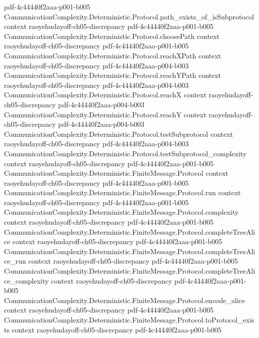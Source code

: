 \begin{lemma}
  {pdf-4c44440f2aaa-p001-b005}
\proofstep
  {CommunicationComplexity.Deterministic.Protocol.path_exists_of_isSubprotocol}
  {context}
  {raoyehudayoff-ch05-discrepancy}
  {pdf-4c44440f2aaa-p001-b005}
\proofstep
  {CommunicationComplexity.Deterministic.Protocol.choosePath}
  {context}
  {raoyehudayoff-ch05-discrepancy}
  {pdf-4c44440f2aaa-p001-b005}
\proofstep
  {CommunicationComplexity.Deterministic.Protocol.reachXPath}
  {context}
  {raoyehudayoff-ch05-discrepancy}
  {pdf-4c44440f2aaa-p004-b003}
\proofstep
  {CommunicationComplexity.Deterministic.Protocol.reachYPath}
  {context}
  {raoyehudayoff-ch05-discrepancy}
  {pdf-4c44440f2aaa-p004-b003}
\proofstep
  {CommunicationComplexity.Deterministic.Protocol.reachX}
  {context}
  {raoyehudayoff-ch05-discrepancy}
  {pdf-4c44440f2aaa-p004-b003}
\proofstep
  {CommunicationComplexity.Deterministic.Protocol.reachY}
  {context}
  {raoyehudayoff-ch05-discrepancy}
  {pdf-4c44440f2aaa-p004-b003}
\proofstep
  {CommunicationComplexity.Deterministic.Protocol.testSubprotocol}
  {context}
  {raoyehudayoff-ch05-discrepancy}
  {pdf-4c44440f2aaa-p004-b003}
\proofstep
  {CommunicationComplexity.Deterministic.Protocol.testSubprotocol_complexity}
  {context}
  {raoyehudayoff-ch05-discrepancy}
  {pdf-4c44440f2aaa-p001-b005}
\proofstep
  {CommunicationComplexity.Deterministic.FiniteMessage.Protocol}
  {context}
  {raoyehudayoff-ch05-discrepancy}
  {pdf-4c44440f2aaa-p001-b005}
\proofstep
  {CommunicationComplexity.Deterministic.FiniteMessage.Protocol.run}
  {context}
  {raoyehudayoff-ch05-discrepancy}
  {pdf-4c44440f2aaa-p001-b005}
\proofstep
  {CommunicationComplexity.Deterministic.FiniteMessage.Protocol.complexity}
  {context}
  {raoyehudayoff-ch05-discrepancy}
  {pdf-4c44440f2aaa-p001-b005}
\proofstep
  {CommunicationComplexity.Deterministic.FiniteMessage.Protocol.completeTreeAlice}
  {context}
  {raoyehudayoff-ch05-discrepancy}
  {pdf-4c44440f2aaa-p001-b005}
\proofstep
  {CommunicationComplexity.Deterministic.FiniteMessage.Protocol.completeTreeAlice_run}
  {context}
  {raoyehudayoff-ch05-discrepancy}
  {pdf-4c44440f2aaa-p001-b005}
\proofstep
  {CommunicationComplexity.Deterministic.FiniteMessage.Protocol.completeTreeAlice_complexity}
  {context}
  {raoyehudayoff-ch05-discrepancy}
  {pdf-4c44440f2aaa-p001-b005}
\proofstep
  {CommunicationComplexity.Deterministic.FiniteMessage.Protocol.encode_alice}
  {context}
  {raoyehudayoff-ch05-discrepancy}
  {pdf-4c44440f2aaa-p001-b005}
\proofstep
  {CommunicationComplexity.Deterministic.FiniteMessage.Protocol.toProtocol_exists}
  {context}
  {raoyehudayoff-ch05-discrepancy}
  {pdf-4c44440f2aaa-p001-b005}

\end{lemma}
